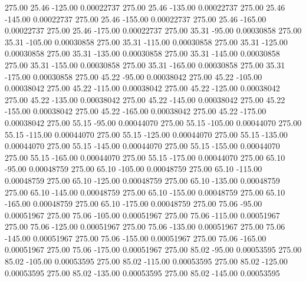     275.00     25.46   -125.00     0.00022737
    275.00     25.46   -135.00     0.00022737
    275.00     25.46   -145.00     0.00022737
    275.00     25.46   -155.00     0.00022737
    275.00     25.46   -165.00     0.00022737
    275.00     25.46   -175.00     0.00022737
    275.00     35.31    -95.00     0.00030858
    275.00     35.31   -105.00     0.00030858
    275.00     35.31   -115.00     0.00030858
    275.00     35.31   -125.00     0.00030858
    275.00     35.31   -135.00     0.00030858
    275.00     35.31   -145.00     0.00030858
    275.00     35.31   -155.00     0.00030858
    275.00     35.31   -165.00     0.00030858
    275.00     35.31   -175.00     0.00030858
    275.00     45.22    -95.00     0.00038042
    275.00     45.22   -105.00     0.00038042
    275.00     45.22   -115.00     0.00038042
    275.00     45.22   -125.00     0.00038042
    275.00     45.22   -135.00     0.00038042
    275.00     45.22   -145.00     0.00038042
    275.00     45.22   -155.00     0.00038042
    275.00     45.22   -165.00     0.00038042
    275.00     45.22   -175.00     0.00038042
    275.00     55.15    -95.00     0.00044070
    275.00     55.15   -105.00     0.00044070
    275.00     55.15   -115.00     0.00044070
    275.00     55.15   -125.00     0.00044070
    275.00     55.15   -135.00     0.00044070
    275.00     55.15   -145.00     0.00044070
    275.00     55.15   -155.00     0.00044070
    275.00     55.15   -165.00     0.00044070
    275.00     55.15   -175.00     0.00044070
    275.00     65.10    -95.00     0.00048759
    275.00     65.10   -105.00     0.00048759
    275.00     65.10   -115.00     0.00048759
    275.00     65.10   -125.00     0.00048759
    275.00     65.10   -135.00     0.00048759
    275.00     65.10   -145.00     0.00048759
    275.00     65.10   -155.00     0.00048759
    275.00     65.10   -165.00     0.00048759
    275.00     65.10   -175.00     0.00048759
    275.00     75.06    -95.00     0.00051967
    275.00     75.06   -105.00     0.00051967
    275.00     75.06   -115.00     0.00051967
    275.00     75.06   -125.00     0.00051967
    275.00     75.06   -135.00     0.00051967
    275.00     75.06   -145.00     0.00051967
    275.00     75.06   -155.00     0.00051967
    275.00     75.06   -165.00     0.00051967
    275.00     75.06   -175.00     0.00051967
    275.00     85.02    -95.00     0.00053595
    275.00     85.02   -105.00     0.00053595
    275.00     85.02   -115.00     0.00053595
    275.00     85.02   -125.00     0.00053595
    275.00     85.02   -135.00     0.00053595
    275.00     85.02   -145.00     0.00053595
